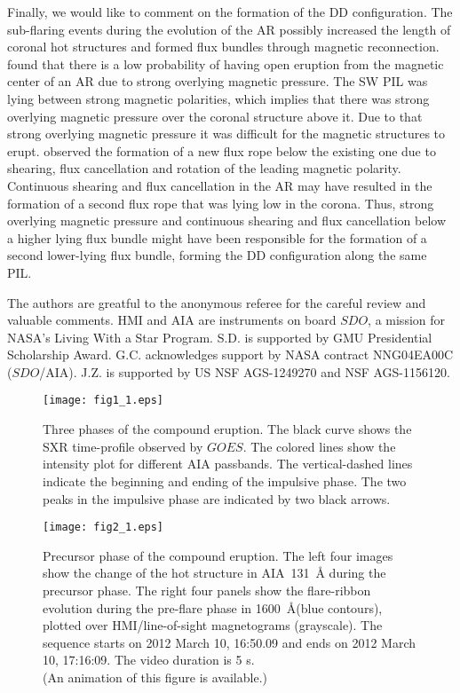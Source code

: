 \documentclass{aastex62}
\begin{document}
Finally, we would like to comment on the formation of the DD configuration. The sub-flaring events during the evolution of the AR possibly increased the length of coronal hot structures and formed flux bundles through magnetic reconnection. \citet{Wang_and_Zhang_2007} found that there is a low probability of having open eruption from the magnetic center of an AR due to strong overlying magnetic pressure. The SW PIL was lying between strong magnetic polarities, which implies that there was strong overlying magnetic pressure over the coronal structure above it. Due to that strong overlying magnetic pressure it was difficult for the magnetic structures to erupt. \citet{Cheng_etal_2014} observed the formation of a new flux rope below the existing one due to shearing, flux cancellation and rotation of the leading magnetic polarity. Continuous shearing and flux cancellation in the AR may have resulted in the formation of a second flux rope that was lying low in the corona. Thus, strong overlying magnetic pressure and continuous shearing and flux cancellation below a higher lying flux bundle might have been responsible for the formation of a second lower-lying flux bundle, forming the DD configuration along the same PIL. 

\acknowledgments
The authors are greatful to the anonymous referee for the careful review and valuable comments. HMI and AIA are instruments on board $\textit{SDO}$, a mission for NASA's Living With a Star Program. S.D. is supported by GMU Presidential Scholarship Award. G.C. acknowledges support by NASA contract NNG04EA00C ($\textit{SDO}$/AIA). J.Z. is supported by US NSF AGS-1249270 and NSF AGS-1156120.





\begin{figure}[h]
\centering
\texttt{[image: fig1\_1.eps]}
\caption{Three phases of the compound eruption. The black curve shows the SXR time-profile observed by $\textit{GOES}$. The colored lines show the intensity plot for different AIA passbands. The vertical-dashed lines indicate the beginning and ending of the impulsive phase. The two peaks in the impulsive phase are  indicated by two black arrows.}
\label{fig:three_phase}
\end{figure}

\begin{figure}[h]
\centering
\texttt{[image: fig2\_1.eps]}
\caption{Precursor phase of the compound eruption. The left four images show the change of the hot structure in AIA~131~\AA{} during the precursor phase. The right four panels show the flare-ribbon evolution during the pre-flare phase in 1600~\AA (blue contours), plotted over HMI/line-of-sight magnetograms (grayscale).
The sequence starts on 2012 March 10, 16:50.09 and ends on 2012 March 10, 17:16:09. The video duration is 5 s.\\
(An animation of this figure is available.)}
\label{fig:pre_flare}
\end{figure}
\end{document}
